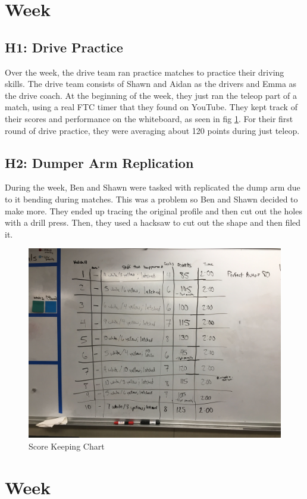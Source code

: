 \documentclass{article}
\begin{document}
\clearpage \newpage \section{Week \thesection} 
\subsection{H1: Drive Practice}

Over the week, the drive team ran practice matches to practice their driving skills. The drive team consists of Shawn and Aidan as the drivers and Emma as the drive coach. At the beginning of the week, they just ran the teleop part of a match, using a real FTC timer that they found on YouTube. They kept track of their scores and performance on the whiteboard, as seen in fig \ref{fig:chart}. For their first round of drive practice, they were averaging about 120 points during just teleop.

\subsection{H2: Dumper Arm Replication}

During the week, Ben and Shawn were tasked with replicated the dump arm due to it bending during matches. This was a problem so Ben and Shawn decided to make more. They ended up tracing the original profile and then cut out the holes with a drill press. Then, they used a hacksaw to cut out the shape and then filed it. 

\begin{figure}
    \centering
    \includegraphics[width=.6 \textwidth]{23_02-04/images/IMG_1512.JPG}
    \caption{Score Keeping Chart}
    \label{fig:chart}
\end{figure}


\clearpage \newpage \section{Week \thesection} 
\end{document}

